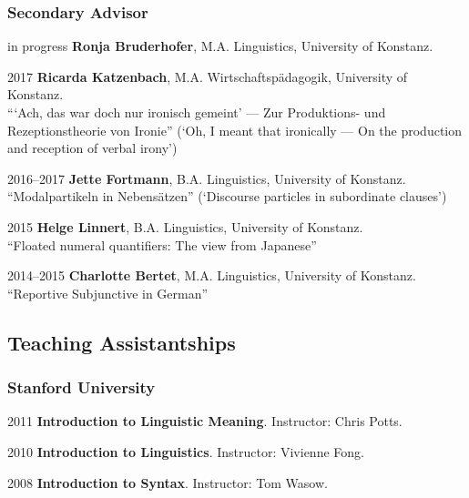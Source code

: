 \subsubsection*{Secondary Advisor}
\begin{dated}
	\item[in progress] 
		\textbf{Ronja Bruderhofer}, 
		M.A. Linguistics, 
		University of Konstanz.
	\item[2017] 
		\textbf{Ricarda Katzenbach}, 
		M.A. Wirtschaftspädagogik, 
		University of Konstanz.\\
		{``{}`Ach, das war doch nur ironisch gemeint' --- Zur Produktions- und Rezeptionstheorie von Ironie''} (`Oh, I meant that ironically --- On the production and reception of verbal irony')
	\item[2016--2017]
		\textbf{Jette Fortmann}, 
		B.A. Linguistics,
		University of Konstanz.\\
        {``Modalpartikeln in Nebens\"atzen'' (`Discourse particles in subordinate clauses')}
    \item[2015]
    	\textbf{Helge Linnert}, 
    	B.A. Linguistics,
    	University of Konstanz.\\
        {``Floated numeral quantifiers: The view from Japanese''}
    \item[2014--2015]
    	\textbf{Charlotte Bertet}, 
    	M.A. Linguistics,
    	University of Konstanz.\\
        {``Reportive Subjunctive in German''}
\end{dated}
\subsection*{Teaching Assistantships}
\subsubsection*{Stanford University}
\begin{dated}
	\item[2011] \textbf{Introduction to Linguistic Meaning}. Instructor: Chris Potts.
	\item[2010] \textbf{Introduction to Linguistics}. Instructor: Vivienne Fong.
	\item[2008] \textbf{Introduction to Syntax}. Instructor: Tom Wasow.
\end{dated}

